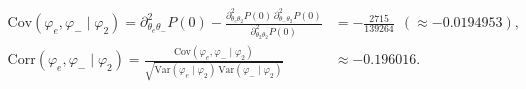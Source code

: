\[
\begin{aligned}
\mathrm{Cov}(\varphi_e,\varphi_-\mid\varphi_2)=\partial_{\theta_e\theta_-}^2P(0)-\frac{\partial_{\theta_e\theta_2}^2P(0)\,\partial_{\theta_-\theta_2}^2P(0)}{\partial_{\theta_2\theta_2}^2P(0)}
&=- \frac{2715}{139264}\ \ (\approx -0.0194953),\\
\mathrm{Corr}(\varphi_e,\varphi_-\mid\varphi_2)=\frac{\mathrm{Cov}(\varphi_e,\varphi_-\mid\varphi_2)}{\sqrt{\mathrm{Var}(\varphi_e\mid\varphi_2)\,\mathrm{Var}(\varphi_-\mid\varphi_2)}}
&\approx -0.196016.
\end{aligned}
\]
